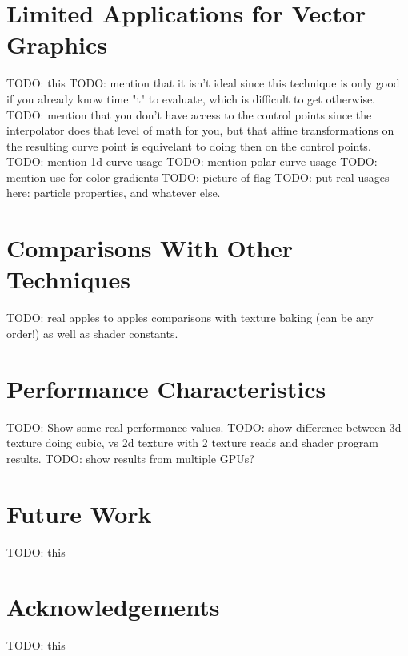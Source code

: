 \documentclass{jcgt}
\begin{document}
\section{Limited Applications for Vector Graphics}
\label{sec:limitedapplicationsforvectorgraphics}

TODO: this
TODO: mention that it isn't ideal since this technique is only good if you already know time "t" to evaluate, which is difficult to get otherwise.
TODO: mention that you don't have access to the control points since the interpolator does that level of math for you, but that affine transformations on the resulting curve point is equivelant to doing then on the control points.
TODO: mention 1d curve usage
TODO: mention polar curve usage
TODO: mention use for color gradients
TODO: picture of flag
TODO: put real usages here: particle properties, and whatever else.


\section{Comparisons With Other Techniques}
\label{sec:comparisonswithothertechniques}

TODO: real apples to apples comparisons with texture baking (can be any order!) as well as shader constants.

\section{Performance Characteristics}
\label{sec:performancecharacteristics}

TODO: Show some real performance values. 
TODO: show difference between 3d texture doing cubic, vs 2d texture with 2 texture reads and shader program results.
TODO: show results from multiple GPUs?

\section*{Future Work}
\label{sec:futurework}

TODO: this

\section*{Acknowledgements}
\label{sec:acknowledgements}
TODO: this
\end{document}
